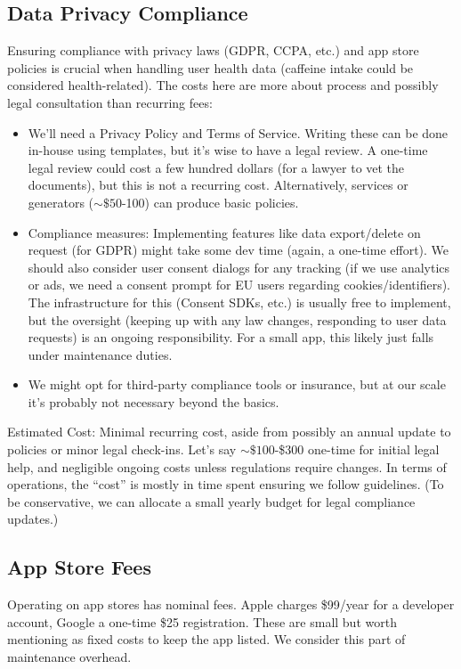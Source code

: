 \documentclass{article}
\begin{document}
\subsection{Data Privacy Compliance}
Ensuring compliance with privacy laws (GDPR, CCPA, etc.) and app store policies is crucial when handling user health data (caffeine intake could be considered health-related). The costs here are more about process and possibly legal consultation than recurring fees:
\begin{itemize}
    \item We’ll need a Privacy Policy and Terms of Service. Writing these can be done in-house using templates, but it’s wise to have a legal review. A one-time legal review could cost a few hundred dollars (for a lawyer to vet the documents), but this is not a recurring cost. Alternatively, services or generators (\(\sim\$50\)-100) can produce basic policies.
    \item Compliance measures: Implementing features like data export/delete on request (for GDPR) might take some dev time (again, a one-time effort). We should also consider user consent dialogs for any tracking (if we use analytics or ads, we need a consent prompt for EU users regarding cookies/identifiers). The infrastructure for this (Consent SDKs, etc.) is usually free to implement, but the oversight (keeping up with any law changes, responding to user data requests) is an ongoing responsibility. For a small app, this likely just falls under maintenance duties.
    \item We might opt for third-party compliance tools or insurance, but at our scale it’s probably not necessary beyond the basics.
\end{itemize}
Estimated Cost: Minimal recurring cost, aside from possibly an annual update to policies or minor legal check-ins. Let’s say \(\sim\$100\)-\$300 one-time for initial legal help, and negligible ongoing costs unless regulations require changes. In terms of operations, the “cost” is mostly in time spent ensuring we follow guidelines. (To be conservative, we can allocate a small yearly budget for legal compliance updates.)

\subsection{App Store Fees}
Operating on app stores has nominal fees. Apple charges \$99/year for a developer account, Google a one-time \$25 registration. These are small but worth mentioning as fixed costs to keep the app listed. We consider this part of maintenance overhead.
\end{document}
